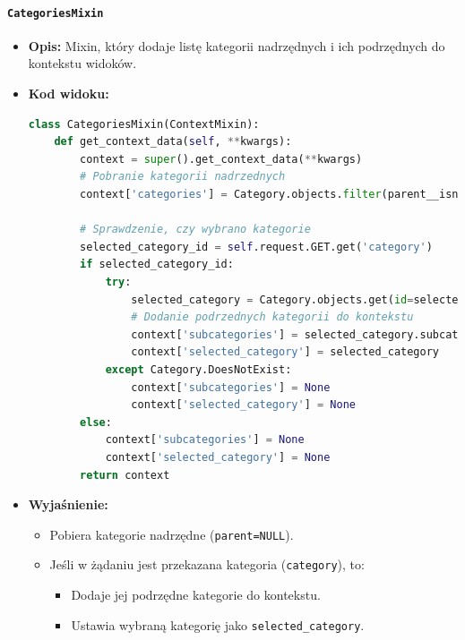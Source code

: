 \documentclass[12pt,a4paper,oneside]{article}
\theoremstyle{definition}
\numberwithin{equation}{section}
\begin{document}
\paragraph{\texttt{CategoriesMixin}}
\begin{itemize}
    \item \textbf{Opis:} Mixin, który dodaje listę kategorii nadrzędnych i ich podrzędnych do kontekstu widoków.
    \item \textbf{Kod widoku:}
\begin{lstlisting}[language=Python, caption=Kod widoku CategoriesMixin]
class CategoriesMixin(ContextMixin):
    def get_context_data(self, **kwargs):
        context = super().get_context_data(**kwargs)
        # Pobranie kategorii nadrzednych
        context['categories'] = Category.objects.filter(parent__isnull=True)

        # Sprawdzenie, czy wybrano kategorie
        selected_category_id = self.request.GET.get('category')
        if selected_category_id:
            try:
                selected_category = Category.objects.get(id=selected_category_id)
                # Dodanie podrzednych kategorii do kontekstu
                context['subcategories'] = selected_category.subcategories.all()
                context['selected_category'] = selected_category
            except Category.DoesNotExist:
                context['subcategories'] = None
                context['selected_category'] = None
        else:
            context['subcategories'] = None
            context['selected_category'] = None
        return context
\end{lstlisting}

    \item \textbf{Wyjaśnienie:}
    \begin{itemize}
        \item Pobiera kategorie nadrzędne (\texttt{parent=NULL}).
        \item Jeśli w żądaniu jest przekazana kategoria (\texttt{category}), to:
        \begin{itemize}
            \item Dodaje jej podrzędne kategorie do kontekstu.
            \item Ustawia wybraną kategorię jako \texttt{selected\_category}.
        \end{itemize}
    \end{itemize}
\end{itemize}
\end{document}
